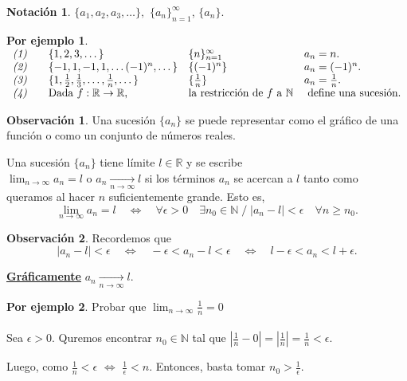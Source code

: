 \documentclass{article}
\theoremstyle{definition}
\newtheorem*{obs}{Observación}
\newtheorem*{ej}{Por ejemplo}
\newtheorem*{notacion}{Notación}
\theoremstyle{remark}
\begin{document}
\begin{notacion}
  $\{a_1,a_2,a_3, \dots \},$ $\{a_n\}_{n=1}^{\infty}$, $\{a_n\}$.
\end{notacion}
\begin{ej} \; \\
  $\begin{array}{lllll}

    \emph{(1)} &  & \{1,2,3, \dots \}& \{n\}_{n=1}^{\infty}& a_n=n.  \\

    \emph{(2)} &  & \{-1,1,-1,1, \dots (-1)^n, \dots \}&\{(-1)^n\}& a_n=(-1)^n. \\
    \emph{(3)} &  & \{1,\frac{1}{2},\frac{1}{3},\dots, \frac{1}{n},\dots\}& \{\frac{1}{n}\}& a_n=\frac{1}{n}.   \\
    \emph{(4)} &  & \text{Dada } f : \mathbb{R} \to \mathbb{R}, & \text{la restricción de $f$ a } \mathbb{N} & \text{ define una sucesión}.
  \end{array}$
\end{ej}
\begin{obs}
  Una sucesión $\{a_n\}$ se puede representar como el gráfico de una función o como un conjunto de números reales.

  \begin{figure}[h]
\centering
\def\svgwidth{0.75\textwidth}

\end{figure}
\end{obs}
\begin{defi}
  Una sucesión $\{a_n\}$ tiene límite $ l \in \mathbb{R} $ y se escribe \\
  $\lim_{n \to \infty}{a_n}=l$ o $a_n \underset{n \to \infty}{\longrightarrow} l$ si los términos $a_n$ se acercan a $l$ tanto como queramos al hacer $n$ suficientemente grande. Esto es,
  \[
    \lim_{n \to \infty } {a_n} = l\quad  \Longleftrightarrow \quad \forall \epsilon > 0\quad  \exists n_0 \in \mathbb{N} \;  / \;  |a_n - l| < \epsilon\quad  \forall n \geq n_0.
  \]
\end{defi}
\begin{obs}
    Recordemos que \[
      | a_n - l| < \epsilon \quad \Leftrightarrow \quad -\epsilon < a_n - l < \epsilon \quad \Leftrightarrow \quad l - \epsilon < a_n < l + \epsilon.
    \]
\end{obs}
\textbf{\underline{Gráficamente}}  $a_n \underset{n \to \infty}{\longrightarrow} l$.
\begin{figure}
\centering
\def\svgwidth{0.75\textwidth}

\end{figure}
\begin{ej}
  Probar que $\lim_{n \to \infty}{\frac{1}{n}}=0$ \\
  \\
  Sea $\epsilon > 0$. Quremos encontrar $n_0 \in \mathbb{N}$ tal que $\left\vert \frac{1}{n}-0\right\vert=\left\vert \frac{1}{n} \right\vert = \frac{1}{n} < \epsilon$.

  Luego, como $\frac{1}{n} < \epsilon$ $\Leftrightarrow$ $\frac{1}{\epsilon} < n$. Entonces, basta tomar $n_0 > \frac{1}{\epsilon}$.
\end{ej}
\end{document}
